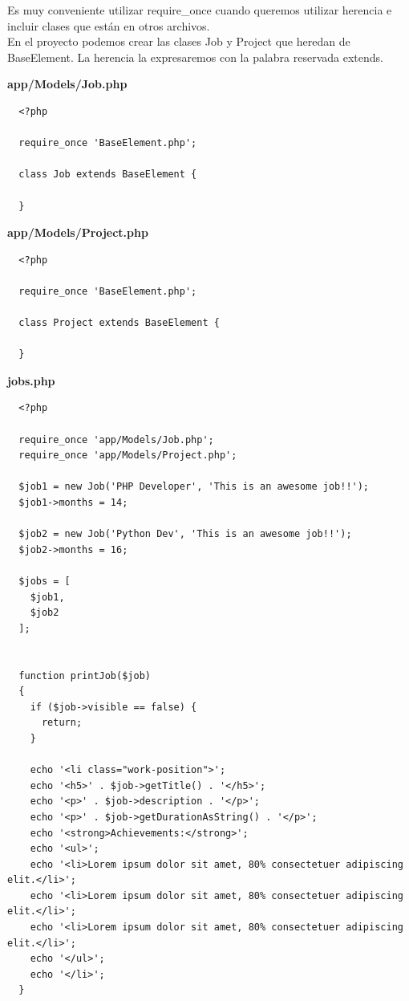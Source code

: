 \documentclass{article}
\begin{document}
Es muy conveniente utilizar require\_once cuando queremos utilizar herencia e
incluir clases que están en otros archivos.\\

En el proyecto podemos crear las clases Job y Project que heredan de
BaseElement. La herencia la expresaremos con la palabra reservada extends.\\

\newpage

\textbf{app/Models/Job.php}
\begin{verbatim}
  <?php

  require_once 'BaseElement.php';

  class Job extends BaseElement {

  }
\end{verbatim}

\textbf{app/Models/Project.php}
\begin{verbatim}
  <?php

  require_once 'BaseElement.php';

  class Project extends BaseElement {

  }
\end{verbatim}

\textbf{jobs.php}
\begin{verbatim}
  <?php

  require_once 'app/Models/Job.php';
  require_once 'app/Models/Project.php';

  $job1 = new Job('PHP Developer', 'This is an awesome job!!');
  $job1->months = 14;

  $job2 = new Job('Python Dev', 'This is an awesome job!!');
  $job2->months = 16;

  $jobs = [
    $job1,
    $job2
  ];


  function printJob($job)
  {
    if ($job->visible == false) {
      return;
    }

    echo '<li class="work-position">';
    echo '<h5>' . $job->getTitle() . '</h5>';
    echo '<p>' . $job->description . '</p>';
    echo '<p>' . $job->getDurationAsString() . '</p>';
    echo '<strong>Achievements:</strong>';
    echo '<ul>';
    echo '<li>Lorem ipsum dolor sit amet, 80% consectetuer adipiscing elit.</li>';
    echo '<li>Lorem ipsum dolor sit amet, 80% consectetuer adipiscing elit.</li>';
    echo '<li>Lorem ipsum dolor sit amet, 80% consectetuer adipiscing elit.</li>';
    echo '</ul>';
    echo '</li>';
  }
\end{verbatim}
\end{document}
